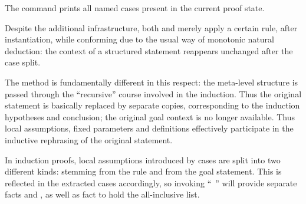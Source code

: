 \begin{isabellebody}
\begin{isamarkuptext}
  The \hyperlink{command.print-cases}{\mbox{}} command prints all named cases present
  in the current proof state.

  \medskip Despite the additional infrastructure, both \hyperlink{method.cases}{\mbox{}}
  and \hyperlink{method.coinduct}{\mbox{}} merely apply a certain rule, after
  instantiation, while conforming due to the usual way of monotonic
  natural deduction: the context of a structured statement 
  reappears unchanged after the case split.

  The \hyperlink{method.induct}{\mbox{}} method is fundamentally different in this
  respect: the meta-level structure is passed through the
  ``recursive'' course involved in the induction.  Thus the original
  statement is basically replaced by separate copies, corresponding to
  the induction hypotheses and conclusion; the original goal context
  is no longer available.  Thus local assumptions, fixed parameters
  and definitions effectively participate in the inductive rephrasing
  of the original statement.

  In induction proofs, local assumptions introduced by cases are split
  into two different kinds:  stemming from the rule and
   from the goal statement.  This is reflected in the
  extracted cases accordingly, so invoking ``\hyperlink{command.case}{\mbox{}}~'' will provide separate facts  and ,
  as well as fact  to hold the all-inclusive list.


\end{isamarkuptext}
\end{isabellebody}
